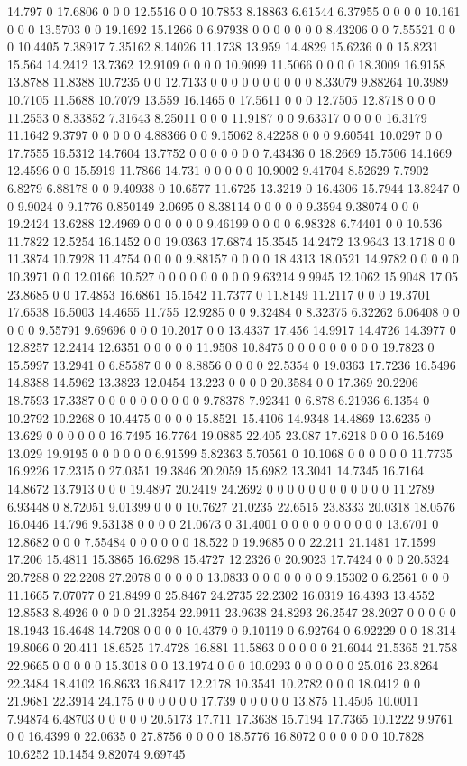 14.797 0 17.6806 0 0 0 12.5516 0 0 10.7853 8.18863 6.61544 6.37955 0 0 0 0 10.161 0 0 0 13.5703 0 0 19.1692 15.1266 0 6.97938 0 0 0 0 0 0 0 8.43206 0 0 7.55521 0 0 0 10.4405 7.38917 7.35162 8.14026 11.1738 13.959 14.4829 15.6236 0 0 15.8231 15.564 14.2412 13.7362 12.9109 0 0 0 0 10.9099 11.5066 0 0 0 0 18.3009 16.9158 13.8788 11.8388 10.7235 0 0 12.7133 0 0 0 0 0 0 0 0 0 0 8.33079 9.88264 10.3989 10.7105 11.5688 10.7079 13.559 16.1465 0 17.5611 0 0 0 12.7505 12.8718 0 0 0 11.2553 0 8.33852 7.31643 8.25011 0 0 0 11.9187 0 0 9.63317 0 0 0 0 16.3179 11.1642 9.3797 0 0 0 0 0 4.88366 0 0 9.15062 8.42258 0 0 0 9.60541 10.0297 0 0 17.7555 16.5312 14.7604 13.7752 0 0 0 0 0 0 0 7.43436 0 18.2669 15.7506 14.1669 12.4596 0 0 15.5919 11.7866 14.731 0 0 0 0 0 10.9002 9.41704 8.52629 7.7902 6.8279 6.88178 0 0 9.40938 0 10.6577 11.6725 13.3219 0 16.4306 15.7944 13.8247 0 0 9.9024 0 9.1776 0.850149 2.0695 0 8.38114 0 0 0 0 0 9.3594 9.38074 0 0 0 19.2424 13.6288 12.4969 0 0 0 0 0 0 9.46199 0 0 0 0 6.98328 6.74401 0 0 10.536 11.7822 12.5254 16.1452 0 0 19.0363 17.6874 15.3545 14.2472 13.9643 13.1718 0 0 11.3874 10.7928 11.4754 0 0 0 0 9.88157 0 0 0 0 18.4313 18.0521 14.9782 0 0 0 0 0 10.3971 0 0 12.0166 10.527 0 0 0 0 0 0 0 0 0 9.63214 9.9945 12.1062 15.9048 17.05 23.8685 0 0 17.4853 16.6861 15.1542 11.7377 0 11.8149 11.2117 0 0 0 19.3701 17.6538 16.5003 14.4655 11.755 12.9285 0 0 9.32484 0 8.32375 6.32262 6.06408 0 0 0 0 0 9.55791 9.69696 0 0 0 10.2017 0 0 13.4337 17.456 14.9917 14.4726 14.3977 0 12.8257 12.2414 12.6351 0 0 0 0 0 11.9508 10.8475 0 0 0 0 0 0 0 0 0 19.7823 0 15.5997 13.2941 0 6.85587 0 0 0 8.8856 0 0 0 0 22.5354 0 19.0363 17.7236 16.5496 14.8388 14.5962 13.3823 12.0454 13.223 0 0 0 0 20.3584 0 0 17.369 20.2206 18.7593 17.3387 0 0 0 0 0 0 0 0 0 0 9.78378 7.92341 0 6.878 6.21936 6.1354 0 10.2792 10.2268 0 10.4475 0 0 0 0 15.8521 15.4106 14.9348 14.4869 13.6235 0 13.629 0 0 0 0 0 0 16.7495 16.7764 19.0885 22.405 23.087 17.6218 0 0 0 16.5469 13.029 19.9195 0 0 0 0 0 0 6.91599 5.82363 5.70561 0 10.1068 0 0 0 0 0 0 11.7735 16.9226 17.2315 0 27.0351 19.3846 20.2059 15.6982 13.3041 14.7345 16.7164 14.8672 13.7913 0 0 0 19.4897 20.2419 24.2692 0 0 0 0 0 0 0 0 0 0 0 0 11.2789 6.93448 0 8.72051 9.01399 0 0 0 10.7627 21.0235 22.6515 23.8333 20.0318 18.0576 16.0446 14.796 9.53138 0 0 0 0 21.0673 0 31.4001 0 0 0 0 0 0 0 0 0 0 13.6701 0 12.8682 0 0 0 7.55484 0 0 0 0 0 0 18.522 0 19.9685 0 0 22.211 21.1481 17.1599 17.206 15.4811 15.3865 16.6298 15.4727 12.2326 0 20.9023 17.7424 0 0 0 20.5324 20.7288 0 22.2208 27.2078 0 0 0 0 0 13.0833 0 0 0 0 0 0 0 9.15302 0 6.2561 0 0 0 11.1665 7.07077 0 21.8499 0 25.8467 24.2735 22.2302 16.0319 16.4393 13.4552 12.8583 8.4926 0 0 0 0 21.3254 22.9911 23.9638 24.8293 26.2547 28.2027 0 0 0 0 0 18.1943 16.4648 14.7208 0 0 0 0 10.4379 0 9.10119 0 6.92764 0 6.92229 0 0 18.314 19.8066 0 20.411 18.6525 17.4728 16.881 11.5863 0 0 0 0 0 21.6044 21.5365 21.758 22.9665 0 0 0 0 0 15.3018 0 0 13.1974 0 0 0 10.0293 0 0 0 0 0 0 25.016 23.8264 22.3484 18.4102 16.8633 16.8417 12.2178 10.3541 10.2782 0 0 0 18.0412 0 0 21.9681 22.3914 24.175 0 0 0 0 0 0 17.739 0 0 0 0 0 13.875 11.4505 10.0011 7.94874 6.48703 0 0 0 0 0 20.5173 17.711 17.3638 15.7194 17.7365 10.1222 9.9761 0 0 16.4399 0 22.0635 0 27.8756 0 0 0 0 18.5776 16.8072 0 0 0 0 0 0 10.7828 10.6252 10.1454 9.82074 9.69745 